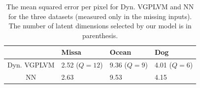 \documentclass [10pt , a4paper]{article}
\begin{document}
\begin{table}[h]
\caption{
\small{
  The mean squared error per pixel for Dyn. VGPLVM and NN for the three datasets (measured only in the missing inputs).
  The number of latent dimensions selected by our model is in parenthesis. 
} }
\label{videoResultsTable}
\begin{center}
\begin{tabular}{c||l|l|l}
             & Missa & Ocean & Dog \\
\hline \hline
Dyn. VGPLVM  & 2.52 ($Q = 12$) & 9.36 ($Q = 9$)  & 4.01 ($Q = 6$) \\  \hline
NN           & 2.63 & 9.53 & 4.15 \\
\end{tabular}
\end{center}
\end{table}
\end{document}
